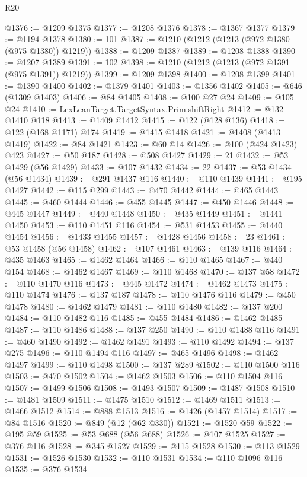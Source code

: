 \begin{lexlean}{R20}
\begin{coremodule}
@1376 := @1209 @1375
@1377 := @1208 @1376
@1378 := @1367 @1377
@1379 := @1194 @1378
@1380 := 101
@1387 := @1210 (@1212 (@1213 (@972 @1380 (@975 @1380)) @1219))
@1388 := @1209 @1387
@1389 := @1208 @1388
@1390 := @1207 @1389
@1391 := 102
@1398 := @1210 (@1212 (@1213 (@972 @1391 (@975 @1391)) @1219))
@1399 := @1209 @1398
@1400 := @1208 @1399
@1401 := @1390 @1400
@1402 := @1379 @1401
@1403 := @1356 @1402
@1405 := @646 (@1309 @1403)
@1406 := @84 @1405
@1408 := @100 @27 @24
@1409 := @105 @24
@1410 := LexLeanTarget.TargetSyntax.Prim.shiftRight
@1412 := @132 @1410 @118
@1413 := @1409 @1412
@1415 := @122 (@128 @136)
@1418 := @122 (@168 @1171) @174
@1419 := @1415 @1418
@1421 := @1408 (@1413 @1419)
@1422 := @84 @1421
@1423 := @60 @14
@1426 := @100 (@424 @1423) @423
@1427 := @50 @187
@1428 := @508 @1427
@1429 := 21
@1432 := @53 @1429 (@56 @1429)
@1433 := @107 @1432
@1434 := 22
@1437 := @53 @1434 (@56 @1434)
@1439 := @291 @1437 @116
@1440 := @110 @1439
@1441 := @195 @1427
@1442 := @115 @299
@1443 := @470 @1442
@1444 := @465 @1443
@1445 := @460 @1444
@1446 := @455 @1445
@1447 := @450 @1446
@1448 := @445 @1447
@1449 := @440 @1448
@1450 := @435 @1449
@1451 := @1441 @1450
@1453 := @110 @1451 @116
@1454 := @531 @1453
@1455 := @1440 @1454
@1456 := @1433 @1455
@1457 := @1428 @1456
@1458 := 23
@1461 := @53 @1458 (@56 @1458)
@1462 := @107 @1461
@1463 := @139 @116
@1464 := @435 @1463
@1465 := @1462 @1464
@1466 := @110 @1465
@1467 := @440 @154
@1468 := @1462 @1467
@1469 := @110 @1468
@1470 := @137 @58
@1472 := @110 @1470 @116
@1473 := @445 @1472
@1474 := @1462 @1473
@1475 := @110 @1474
@1476 := @137 @187
@1478 := @110 @1476 @116
@1479 := @450 @1478
@1480 := @1462 @1479
@1481 := @110 @1480
@1482 := @137 @200
@1484 := @110 @1482 @116
@1485 := @455 @1484
@1486 := @1462 @1485
@1487 := @110 @1486
@1488 := @137 @250
@1490 := @110 @1488 @116
@1491 := @460 @1490
@1492 := @1462 @1491
@1493 := @110 @1492
@1494 := @137 @275
@1496 := @110 @1494 @116
@1497 := @465 @1496
@1498 := @1462 @1497
@1499 := @110 @1498
@1500 := @137 @289
@1502 := @110 @1500 @116
@1503 := @470 @1502
@1504 := @1462 @1503
@1506 := @110 @1504 @116
@1507 := @1499 @1506
@1508 := @1493 @1507
@1509 := @1487 @1508
@1510 := @1481 @1509
@1511 := @1475 @1510
@1512 := @1469 @1511
@1513 := @1466 @1512
@1514 := @888 @1513
@1516 := @1426 (@1457 @1514)
@1517 := @84 @1516
@1520 := @849 (@12 (@62 @330))
@1521 := @1520 @59
@1522 := @195 @59
@1525 := @53 @688 (@56 @688)
@1526 := @107 @1525
@1527 := @376 @116
@1528 := @345 @1527
@1529 := @115 @1528
@1530 := @113 @1529
@1531 := @1526 @1530
@1532 := @110 @1531
@1534 := @110 @1096 @116
@1535 := @376 @1534

\end{coremodule}
\end{lexlean}
